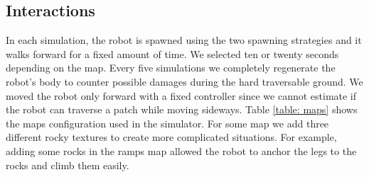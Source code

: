 \documentclass[../document.tex]{subfiles}
\begin{document}
\subsection{Interactions}
In each simulation, the robot is spawned using the two spawning strategies and it walks forward for a fixed amount of time. We selected ten or twenty seconds depending on the map. Every five simulations we completely regenerate the robot's body to counter possible damages during the hard traversable ground. We moved the robot only forward with a fixed controller since we cannot estimate if the robot can traverse a patch while moving sideways. Table \ref{table: maps} shows the maps configuration used in the simulator. For some map we add three different rocky textures to create more complicated situations. For example, adding some rocks in the ramps map allowed the robot to anchor the legs to the rocks and climb them easily.
\end{document}
